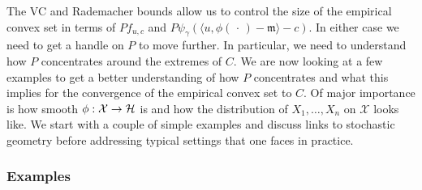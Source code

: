 \documentclass[AHL,Unicode,longabstracts,published]{cedram}
\theoremstyle{remark}
\newcommand{\X}{\mathcal{X}}
\newcommand{\cH}{\mathcal{H}}
\newcommand{\mean}{\mathfrak{m}}
\renewcommand*{\to}{\mathchoice{\longrightarrow}{\rightarrow}{\rightarrow}{\rightarrow}}
\begin{document}
The VC and Rademacher bounds allow us to control the size of the empirical convex set in terms of $P f_{u,c}$ and $P \psi_\gamma(\langle u,\phi(\,\cdot\,) - \mean \rangle -c)$. In either case we need to get a handle on $P$ to move further. In particular, we need to understand how $P$ concentrates around the extremes of $C$. We are now looking at a few examples to get a better understanding of how $P$ concentrates and what this implies for the convergence of the empirical convex set to $C$. Of major importance is how smooth $\phi: \X \to \cH$ is and how the distribution of $X_1,\dots, X_n$ on $\X$ looks like. We start with a couple of simple examples and discuss links to stochastic geometry before addressing typical settings that one faces in practice.



\subsubsection{Examples} 
\end{document}
